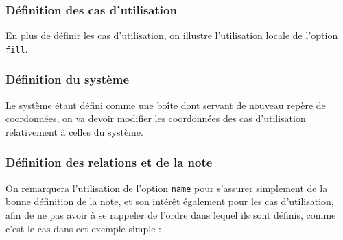 \documentclass[a4paper,11pt]{report}
\newcommand{\inputTikZ}[1]{%
  }%
\newcommand{\inputTikZ}[1]{%
    \texttt{[image: fig/\#1.pdf]}%
  }%
\begin{document}
{\color{red!70!black}

}

\begin{center}
\inputTikZ{figure47}
\end{center}

\subsubsection{Définition des cas d'utilisation}

En plus de définir les cas d'utilisation, on illustre l'utilisation locale de l'option {\tt fill}.

{\color{red!70!black}
\vspace{-0.4cm}
}


\begin{center}
\inputTikZ{figure48}
\end{center}

\subsubsection{Définition du système}

Le système étant défini comme une boîte dont servant de nouveau repère de coordonnées, on va devoir modifier les coordonnées des cas d'utilisation relativement à celles du système.

{\color{red!70!black}
\vspace{-0.4cm}
}
\vspace{-0.4cm}
{\color{red!70!black}
\vspace{-0.4cm}
}


\begin{center}
\inputTikZ{figure49}
\end{center}

\subsubsection{Définition des relations et de la note}

On remarquera l'utilisation de l'option {\tt name} pour s'assurer simplement de la bonne définition de la note, et son intérêt également pour les cas d'utilisation, afin de ne pas avoir à se rappeler de l'ordre dans lequel ils sont définis, comme c'est le cas dans cet exemple simple :
\end{document}
